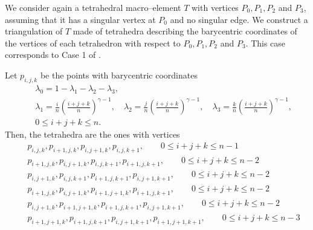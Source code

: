 We consider again a tetrahedral macro--element $T$ with vertices $P_0, P_1, P_2$ and $P_3$, assuming that it has a singular vertex at $P_0$ and no singular edge. We construct a triangulation of $T$ made of tetrahedra describing the barycentric coordinates of the vertices of each tetrahedron with respect to $P_0, P_1, P_2$ and $P_3$. This case corresponds to Case 1 of \cite{AN}.

Let $p_{i,j,k}$ be the points with barycentric coordinates
\begin{eqnarray*}
&&\lambda_0=1-\lambda_1-\lambda_2-\lambda_3,\\
&&\lambda_1=\frac in\left(\frac{i+j+k}n\right)^{\gamma-1},\quad \lambda_2=\frac jn\left(\frac{i+j+k}n\right)^{\gamma-1},\quad \lambda_3=\frac kn\left(\frac{i+j+k}n\right)^{\gamma-1},
\\ &&0\le i+j+k\le n.
\end{eqnarray*}
Then, the tetrahedra are the ones with vertices
\begin{eqnarray*}
&& p_{i,j,k}, p_{i+1,j,k}, p_{i,j+1,k}, p_{i,j,k+1}, \qquad 0\le i+j+k\le n-1\\
&& p_{i+1,j,k}, p_{i,j+1,k}, p_{i,j,k+1}, p_{i+1,j,k+1}, \qquad 0\le i+j+k\le n-2\\
&& p_{i,j+1,k}, p_{i,j,k+1}, p_{i+1,j,k+1}, p_{i,j+1,k+1}, \qquad 0\le i+j+k\le n-2\\
&& p_{i+1,j,k}, p_{i,j+1,k}, p_{i+1,j+1,k}, p_{i+1,j,k+1}, \qquad 0\le i+j+k\le n-2\\
&& p_{i,j+1,k}, p_{i+1,j+1,k}, p_{i+1,j,k+1}, p_{i,j+1,k+1}, \qquad 0\le i+j+k\le n-2\\
&& p_{i+1,j+1,k}, p_{i+1,j,k+1}, p_{i,j+1,k+1}, p_{i+1,j+1,k+1}, \qquad 0\le i+j+k\le n-3
\end{eqnarray*}


